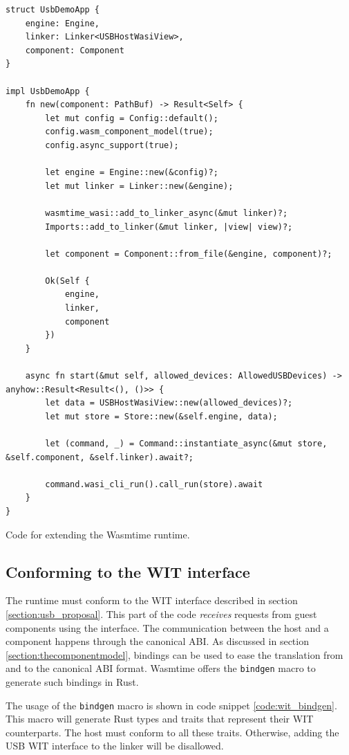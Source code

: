 \begin{code}
\begin{verbatim}
struct UsbDemoApp {
	engine: Engine,
	linker: Linker<USBHostWasiView>,
	component: Component
}

impl UsbDemoApp {
	fn new(component: PathBuf) -> Result<Self> {
		let mut config = Config::default();
		config.wasm_component_model(true);
		config.async_support(true);

		let engine = Engine::new(&config)?;
		let mut linker = Linker::new(&engine);

		wasmtime_wasi::add_to_linker_async(&mut linker)?;
		Imports::add_to_linker(&mut linker, |view| view)?;
		
		let component = Component::from_file(&engine, component)?;

		Ok(Self {
			engine,
			linker,
			component
		})
	}

	async fn start(&mut self, allowed_devices: AllowedUSBDevices) -> anyhow::Result<Result<(), ()>> {
		let data = USBHostWasiView::new(allowed_devices)?;
		let mut store = Store::new(&self.engine, data);
	
		let (command, _) = Command::instantiate_async(&mut store, &self.component, &self.linker).await?;
	
		command.wasi_cli_run().call_run(store).await
	}
}
\end{verbatim} 
\caption{Code for extending the Wasmtime runtime.}
\label{code:start_component}
\end{code}

\subsection{Conforming to the \acrshort{WIT} interface}
The runtime must conform to the \acrshort{WIT} interface described in section \ref{section:usb_proposal}. This part of the code \textit{receives} requests from guest components using the interface. The communication between the host and a component happens through the canonical ABI. As discussed in section \ref{section:thecomponentmodel}, bindings can be used to ease the translation from and to the canonical ABI format. Wasmtime offers the \texttt{bindgen} macro \cite{wasmtime_component_bindgen} to generate such bindings in Rust.

The usage of the \texttt{bindgen} macro is shown in code snippet \ref{code:wit_bindgen}.
This macro will generate Rust types and traits that represent their \acrshort{WIT} counterparts. The host must conform to all these traits. Otherwise, adding the \acrshort{USB} \acrshort{WIT} interface to the linker will be disallowed.

